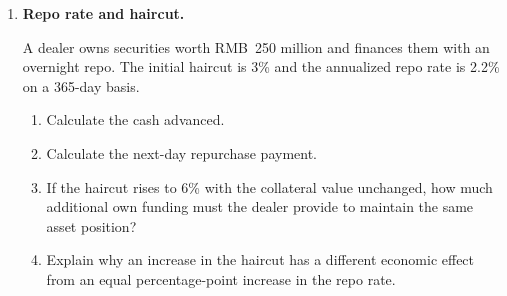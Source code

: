 \begin{enumerate}
A highly rated corporation issues 60-day commercial paper at an annualized rate of 3.8\% when the comparable short-term benchmark rate is 2.9\%.

\begin{enumerate}

\item Calculate the spread over the benchmark.

\item Suppose the benchmark rises to 3.4\% and the spread widens to 1.6 percentage points. What is the new commercial-paper rate?

\item Separate the increase in the funding rate into the benchmark component and the spread component.

\item Give two economic reasons why the spread could widen.

\end{enumerate}

\item \textbf{Repo rate and haircut.}

A dealer owns securities worth RMB~250 million and finances them with an overnight repo. The initial haircut is 3\% and the annualized repo rate is 2.2\% on a 365-day basis.

\begin{enumerate}

\item Calculate the cash advanced.

\item Calculate the next-day repurchase payment.

\item If the haircut rises to 6\% with the collateral value unchanged, how much additional own funding must the dealer provide to maintain the same asset position?

\item Explain why an increase in the haircut has a different economic effect from an equal percentage-point increase in the repo rate.

\end{enumerate}

\end{enumerate}



